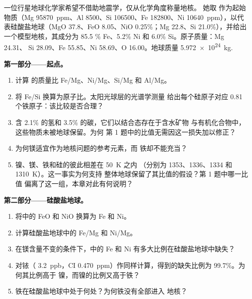 \begin{problem}
\label{pb:b2:elements-in-the-earth:1}
一位行星地球化学家希望不借助地震学，仅从化学角度称量地核。
她取 作为起始物质（Mg
\qty{95870}{ppm}、Al 8500、Si \num{106500}、Fe \num{182800}、Ni
\qty{10640}{ppm}），以代表硅酸盐地球（MgO 37.8、FeO
8.05、NiO 0.25\%；Mg 22.8、Si 21.0\%），并给出一个模型地核，其成分为 85.5
\% Fe、5.2\% Ni 和 6.0\% Si。原子质量：Mg 24.31、
Si 28.09、Fe 55.85、Ni 58.69、O 16.00。地球质量
\qty{5.972e24}{kg}.

\medskip\noindent\textbf{第一部分——起点。}
\begin{enumerate}
\item 计算 的质量比 Fe/Mg、Ni/Mg、Si/Mg 和 Al/Mg。
\item 将 Fe/Si 换算为原子比。太阳光球层的光谱学测量
给出每个硅原子对应 0.81 个铁原子：该比较是否合理？
\item {}含 2.1\% 的氢和 3.5\% 的碳，它们以结合态存在于含水矿物
与有机化合物中，这些物质未被地球保留。为何
第 1 题中的比值无需因这一损失加以修正？
\item 为何镁适宜作为地核问题的参考元素，而
铁却不能充当？
\item 镍、镁、铁和硅的彼此相差在 \qty{50}{K} 之内
（分别为 1353、1336、1334 和 \qty{1310}{K}）。这一事实为何支持
整体地球保留了其比值的假设？第 1 题中哪一比值
偏离了这一组，本章对此有何说明？
\end{enumerate}

\noindent\textbf{第二部分——硅酸盐地球。}
\begin{enumerate}[resume]
\item 将中的 FeO 和 NiO 换算为 Fe 和 Ni。
\item 计算硅酸盐地球中的 Fe/Mg 和 Ni/Mg。
\item 在镁含量不变的条件下，中的 Fe 和 Ni
有多大比例在硅酸盐地球中缺失？
\item 对铱（ \qty{3.2}{ppb}，CI
\qty{0.470}{ppm}）作同样计算，得到的缺失比例为 99.7\%。为何其比例高于
镍，而镍的比例又高于铁？
\item 铁在硅酸盐地球中处于何处？为何铁没有全部进入
地核？
\end{enumerate}


\end{problem}
